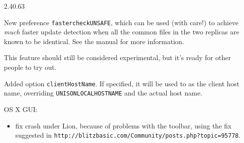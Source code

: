 \begin{changesfromversion}{2.40.63}
\item New preference {\tt fastercheckUNSAFE}, which can be used (with care!)
to achieve {\em much} faster update detection when all the common files in
the two replicas are known to be identical.  See the manual for more
information.

This feature should still be considered experimental, but it's ready for
other people to try out.
\item Added option {\tt clientHostName}. If specified, it will be used to as
the client host name, overriding {\tt UNISONLOCALHOSTNAME} and the actual
host name.
\item OS X GUI:
\begin{itemize}
\item fix crash under Lion, because of problems with the toolbar, using the
fix suggested in {\tt http://blitzbasic.com/Community/posts.php?topic=95778}.


\end{itemize}
\end{changesfromversion}
